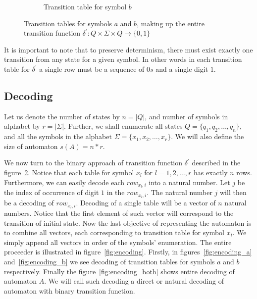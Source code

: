 \documentclass{mini}
\begin{document}
\begin{figure}[H]
\begin{center}
\begin{subfigure}{.5\textwidth}
\begin{tabular}{|P{1.0cm} || P{0.8cm} | P{0.8cm} | P{0.8cm} | P{0.8cm}|}
            \end{tabular}
            
            \caption{Transition table for symbol $b$}
            \label{fig:ttable_bin_b}
            
        \end{subfigure}%
        
        
        \caption{Transition tables for symbols $a$ and $b$, making up the entire transition function $\delta^{'}: Q \times \Sigma \times Q \rightarrow \{0,1\}$}
        
        \label{fig:ttable_bin}
    \end{center}
\end{figure}

It is important to note that to preserve determinism, there must exist exactly one transition from any state for a given symbol. In other words in each transition table for $\delta^{'}$ a single row must be a sequence of $0s$ and a single digit $1$.

\subsection{Decoding} \label{sec:auto_dec}

Let us denote the number of states by $n = |Q|$, and number of symbols in alphabet by $r = |\Sigma|$. Further, we shall enumerate all states 	$Q = \{q_1, q_2, \ldots, q_n\}$, and all the symbols in the alphabet 	$\Sigma = \{x_1, x_2, \ldots, x_r\}$. We will also define the size of automaton $s(A) = n*r$.

We now turn to the binary approach of transition function $\delta^{'}$ described in the figure~\ref{fig:ttable_bin}. Notice that each table for symbol $x_l$ for $l = 1,2, \dots, r$ has exactly $n$ rows. Furthermore, we can easily decode each $row_{x_l, i}$ into a natural number. Let $j$ be the index of occurrence of digit $1$ in the $row_{x_l, i}$. The natural number $j$ will then be a decoding of $row_{x_l, i}$. Decoding of a single table will be a vector of $n$ natural numbers. Notice that the first element of such vector will correspond to the transition of initial state. Now the last objective of representing the automaton is to combine all vectors, each corresponding to transition table for symbol $x_{l}$. We simply append all vectors in order of the symbols' enumeration. The entire proceeder is illustrated in figure~\ref{fig:encoding}. Firstly, in figures~\ref{fig:encoding_a} and~\ref{fig:encoding_b} we see decoding of transition tables for symbols $a$ and $b$ respectively. Finally the figure~\ref{fig:encoding_both} shows entire decoding of automaton $A$. We will call such decoding a direct or natural decoding of automaton with binary transition function.
\end{document}
